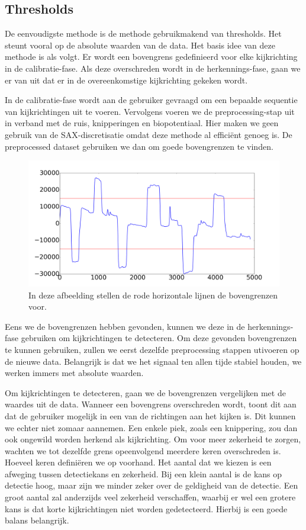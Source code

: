 \documentclass{article}
\begin{document}
\subsection{Thresholds}

De eenvoudigste methode is de methode gebruikmakend van thresholds. Het steunt vooral op de absolute waarden van de data. Het basis idee van deze methode is als volgt. Er wordt een bovengrens gedefinieerd voor elke kijkrichting in de calibratie-fase. Als deze overschreden wordt in de herkennings-fase, gaan we er van uit dat er in de overeenkomstige kijkrichting gekeken wordt.

In de calibratie-fase wordt aan de gebruiker gevraagd om een bepaalde sequentie van kijkrichtingen uit te voeren. Vervolgens voeren we de preprocessing-stap uit in verband met de ruis, knipperingen en biopotentiaal. Hier maken we geen gebruik van de SAX-discretisatie omdat deze methode al efficiënt genoeg is. De preprocessed dataset gebruiken we dan om goede bovengrenzen te vinden.

\begin{figure}[h]
\centering
\includegraphics[width=\linewidth]{images/thresholds_voorbeeld}
\caption{In deze afbeelding stellen de rode horizontale lijnen de bovengrenzen voor.}
\end{figure}

Eens we de bovengrenzen hebben gevonden, kunnen we deze in de herkennings-fase gebruiken om kijkrichtingen te detecteren. Om deze gevonden bovengrenzen te kunnen gebruiken, zullen we eerst dezelfde preprocessing stappen utivoeren op de nieuwe data. Belangrijk is dat we het signaal ten allen tijde stabiel houden, we werken immers met absolute waarden.

Om kijkrichtingen te detecteren, gaan we de bovengrenzen vergelijken met de waardes uit de data. Wanneer een bovengrens overschreden wordt, toont dit aan dat de gebruiker mogelijk in een van de richtingen aan het kijken is. Dit kunnen we echter niet zomaar aannemen. Een enkele piek, zoals een knippering, zou dan ook ongewild worden herkend als kijkrichting. Om voor meer zekerheid te zorgen, wachten we tot dezelfde grens opeenvolgend meerdere keren overschreden is. Hoeveel keren definiëren we op voorhand. Het aantal dat we kiezen is een afweging tussen detectiekans en zekerheid. Bij een klein aantal is de kans op detectie hoog, maar zijn we minder zeker over de geldigheid van de detectie. Een groot aantal zal anderzijds veel zekerheid verschaffen, waarbij er wel een grotere kans is dat korte kijkrichtingen niet worden gedetecteerd. Hierbij is een goede balans belangrijk.
\end{document}
